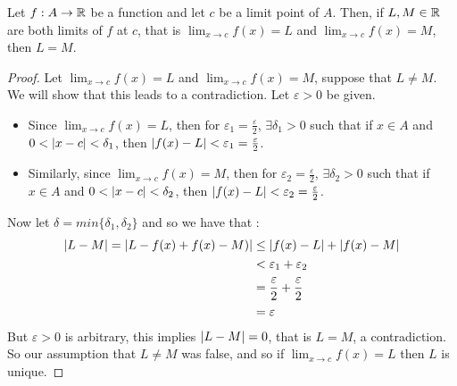 \newpage
\begin{thm}
    Let $f:A \to \mathbb{R}$ be a function and let $c$ be a limit point of $A$. Then, if
    $L,M \in \mathbb{R}$ are both limits of $f$ at $c$, that is $\lim_{x \to c} f(x)=L$
    and $\lim_{x \to c} f(x) = M$, then $L=M$.
    \begin{proof}
        Let $\lim_{x \to c} f(x)=L$ and $\lim_{x \to c} f(x) = M$, suppose that
        $L \neq M$. We will show that this leads to a contradiction. Let
        $\varepsilon>0$ be given.
        \begin{itemize}
            \item Since $\lim_{x \to c} f(x)=L$, then for
            $\varepsilon_1=\tfrac{\varepsilon}{2}$, $\exists\delta_1 >0$ such that
            if $x\in A$ and $0 < \left\lvert x-c\right\rvert<\delta_1$, then
            $\left\lvert f(x)-L\right\rvert<\varepsilon_1=\tfrac{\varepsilon}{2}$.
            \item Similarly, since $\lim_{x \to c} f(x)=M$, then for
            $\varepsilon_2=\tfrac{\varepsilon}{2}$, $\exists\delta_2 >0$ such that
            if $x\in A$ and $0 < \left\lvert x-c\right\rvert<\delta_2$, then
            $\left\lvert f(x)-L\right\rvert<\varepsilon_2=\tfrac{\varepsilon}{2}$.
        \end{itemize}
        Now let $\delta = min\{\delta_1,\delta_2\}$ and so we have that :
        \begin{align*}
            \left\lvert L-M\right\rvert = \left\lvert L-f(x)+f(x)-M)\right\rvert &\leq \left\lvert f(x)-L\right\rvert+\left\lvert f(x)-M\right\rvert\\
           &< \varepsilon_1+\varepsilon_2 \\
           &= \dfrac{\varepsilon}{2}+\dfrac{\varepsilon}{2} \\
           &= \varepsilon
        \end{align*}
        But $\varepsilon>0$ is arbitrary, this implies $\left\lvert L-M\right\rvert=0$, that is
        $L=M$, a contradiction. So our assumption that $L\neq M$ was false, and
        so if $\lim_{x \to c} f(x)=L$ then $L$ is unique.
    \end{proof}
\end{thm}

